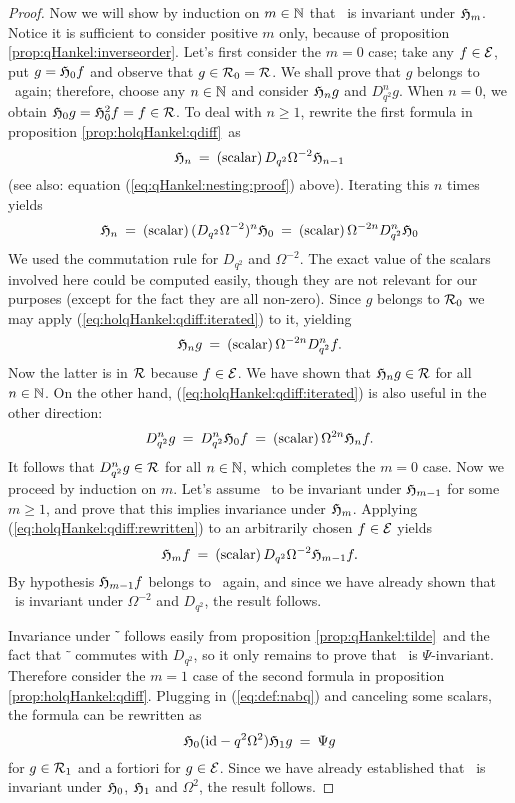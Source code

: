 \begin{proof}
Now we will show by induction on $m\in\mathbb{N}$ that \Hcore\ is invariant under
$\mathfrak{H}_{m}$. Notice it is sufficient to consider positive $m$ only,
because of proposition \ref{prop:qHankel:inverseorder}\@.
Let's first consider the $m=0$ case; take any $f\in\mathcal E$, put $g=\mathfrak{H}_{0}f$
and observe that $g\in{\mathcal R}_{0}=\mathcal R$.
We shall prove that $g$ belongs to \Hcore\ again;
therefore, choose any $n\in \mathbb{N}$ and consider $\mathfrak{H}_{n} g$ and $D_{q^2}^n g$.
When $n=0$, we obtain $\mathfrak{H}_{0} g = \mathfrak{H}_{0}^2 f = f \in \mathcal R$.
To deal with $n\geq 1$, rewrite the first formula in proposition
\ref{prop:holqHankel:qdiff}\ as
\begin{equation}\label{eq:holqHankel:qdiff:rewritten}
   \mathfrak{H}_{n}  \:=\: ({\rm scalar})\, D_{q^2} \Omega^{-2} \mathfrak{H}_{n-1}
\end{equation}
(see also: equation (\ref{eq:qHankel:nesting:proof}) above). Iterating this $n$ times yields
\begin{equation} \label{eq:holqHankel:qdiff:iterated}
   \mathfrak{H}_{n}  \:=\: ({\rm scalar})\, (D_{q^2} \Omega^{-2})^n \mathfrak{H}_{0}
             \:=\: ({\rm scalar})\, \Omega^{-2n} D_{q^2}^n \mathfrak{H}_{0}
\end{equation}
We used the commutation rule for $D_{q^2}$ and $\Omega^{-2}$.
The exact value of the scalars involved here could be computed easily, though
they are not relevant for our purposes (except for the fact they are all non-zero).
Since $g$ belongs to ${\mathcal R}_{0}$ we may apply (\ref{eq:holqHankel:qdiff:iterated})
to it, yielding
$$ \mathfrak{H}_{n} g \:=\: ({\rm scalar})\, \Omega^{-2n} D_{q^2}^n f. $$
Now the latter is in $\mathcal R$ because $f\in\mathcal E$.
We have shown that $\mathfrak{H}_{n} g \in \mathcal R$ for all $n\in \mathbb{N}$.
On the other hand, (\ref{eq:holqHankel:qdiff:iterated}) is also useful in
the other direction:
$$ D_{q^2}^n g \:=\: D_{q^2}^n \mathfrak{H}_{0} f \:=\: ({\rm scalar})\, \Omega^{2n} \mathfrak{H}_{n}f. $$
It follows that $D_{q^2}^n g \in \mathcal R$ for all $n\in \mathbb{N}$,
which completes the $m=0$ case. Now we proceed by induction on $m$.
Let's assume \Hcore\ to be invariant under $\mathfrak{H}_{m-1}$ for some $m\geq 1$,
and prove that this implies invariance under $\mathfrak{H}_{m}$.
Applying (\ref{eq:holqHankel:qdiff:rewritten}) to an arbitrarily chosen $f\in\mathcal E$ yields
$$  \mathfrak{H}_{m} f \:=\: ({\rm scalar})\, D_{q^2} \Omega^{-2} \mathfrak{H}_{m-1} f. $$
By hypothesis $\mathfrak{H}_{m-1} f$ belongs to \Hcore\ again, and since
we have already shown that \Hcore\ is invariant under $\Omega^{-2}$ and
$D_{q^2}$, the result follows.

Invariance under $\tilde{\:}$ follows easily from proposition \ref{prop:qHankel:tilde}\
and the fact that $\tilde{\:}$ commutes with $D_{q^2}$,
so it only remains to prove that \Hcore\ is $\Psi$-invariant.
Therefore consider the $m=1$ case of the second formula in
proposition \ref{prop:holqHankel:qdiff}\@. Plugging in (\ref{eq:def:nabq}) and
canceling some scalars, the formula can be rewritten as
$$ \mathfrak{H}_{0} (\mbox{\rm id} - q^2 \Omega^2) \mathfrak{H}_{1} g \:=\: \Psi g $$
for $g\in{\mathcal R}_{1}$ and a fortiori for $g\in\mathcal E$.
Since we have already established that \Hcore\ is invariant under
$\mathfrak{H}_{0}$, $\mathfrak{H}_{1}$ and $\Omega^2$, the result follows.
\end{proof}


